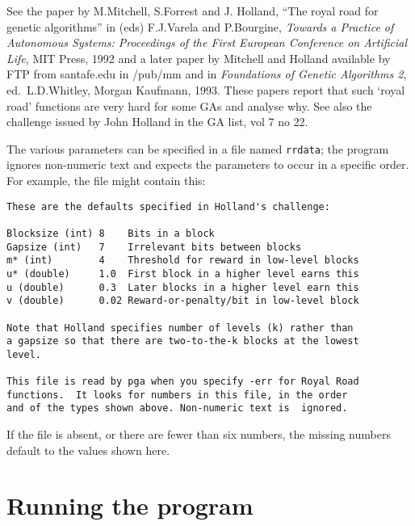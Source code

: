 \begin{description}
  See the paper by M.Mitchell, S.Forrest and J. Holland, ``The royal
  road for genetic algorithms'' in (eds) F.J.Varela and P.Bourgine,
  {\em Towards a Practice of Autonomous Systems: Proceedings of the
  First European Conference on Artificial Life}, MIT Press, 1992
  and a later paper by Mitchell and Holland available by FTP from
  santafe.edu in /pub/mm and in {\em Foundations of Genetic Algorithms
  2}, ed.\ L.D.Whitley, Morgan Kaufmann, 1993.  These papers report
  that such `royal road' functions are very hard for some GAs and
  analyse why. See also the challenge issued by John Holland in the GA
  list, vol 7 no 22.

  The various parameters can be specified in a file named
  \verb|rrdata|; the program ignores non-numeric text and expects
  the parameters to occur in a specific order. For example, the file
  might contain this:
\begin{center}
\begin{verbatim}
These are the defaults specified in Holland's challenge:

Blocksize (int) 8    Bits in a block
Gapsize (int)   7    Irrelevant bits between blocks
m* (int)        4    Threshold for reward in low-level blocks
u* (double)     1.0  First block in a higher level earns this
u (double)      0.3  Later blocks in a higher level earn this
v (double)      0.02 Reward-or-penalty/bit in low-level block

Note that Holland specifies number of levels (k) rather than
a gapsize so that there are two-to-the-k blocks at the lowest
level.

This file is read by pga when you specify -err for Royal Road
functions.  It looks for numbers in this file, in the order 
and of the types shown above. Non-numeric text is  ignored.
\end{verbatim}
\end{center}
  If the file is absent, or there are fewer than six numbers,
  the missing numbers default to the values shown here.
\end{description}

\section*{Running the program}

